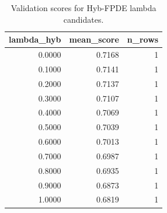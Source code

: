 \begin{table}[t]
\caption{Validation scores for Hyb-FPDE lambda candidates.}
\label{tab:lambda_distribution_computed}
\centering
\begin{tabular}{rrr}
\toprule
lambda\_hyb & mean\_score & n\_rows \\
\midrule
0.0000 & 0.7168 & 1 \\
0.1000 & 0.7141 & 1 \\
0.2000 & 0.7137 & 1 \\
0.3000 & 0.7107 & 1 \\
0.4000 & 0.7069 & 1 \\
0.5000 & 0.7039 & 1 \\
0.6000 & 0.7013 & 1 \\
0.7000 & 0.6987 & 1 \\
0.8000 & 0.6935 & 1 \\
0.9000 & 0.6873 & 1 \\
1.0000 & 0.6819 & 1 \\
\bottomrule
\end{tabular}

\end{table}

